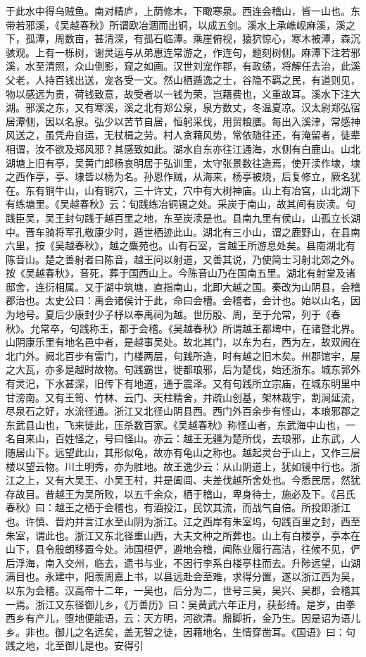 \documentclass[12pt,UTF8]{ctexbook}
\begin{document}
于此水中得乌贼鱼。南对精庐，上荫修木，下瞰寒泉。西连会稽山，皆一山也。东带若邪溪，《吴越春秋》所谓欧冶涸而出铜，以成五剑。溪水上承嶕岘麻溪，溪之下，孤潭，周数亩，甚清深，有孤石临潭。乘崖俯视，猿狖惊心，寒木被潭，森沉骇观。上有一栎树，谢灵运与从弟惠连常游之，作连句，题刻树侧。麻潭下注若邪溪，水至清照，众山倒影，窥之如画。汉世刘宠作郡，有政绩，将解任去治，此溪父老，人持百钱出送，宠各受一文。然山栖遁逸之士，谷隐不羁之民，有道则见，物以感远为贵，荷钱致意，故受者以一钱为荣，岂藉费也，义重故耳。溪水下注大湖。邪溪之东，又有寒溪，溪之北有郑公泉，泉方数丈，冬温夏凉。汉太尉郑弘宿居潭侧，因以名泉。弘少以苦节自居，恒躬采伐，用贸粮膳。每出入溪津，常感神风送之，虽凭舟自运，无杖楫之劳。村人贪藉风势，常依随往还，有淹留者，徒辈相谓，汝不欲及郑风邪？其感致如此。湖水自东亦往江通海，水侧有白鹿山。山北湖塘上旧有亭，吴黄门郎杨哀明居于弘训里，太守张景数往造焉，使开渎作埭，埭之西作亭，亭、埭皆以杨为名。孙恩作贼，从海来，杨亭被烧，后复修立，厥名犹在。东有铜牛山，山有铜穴，三十许丈，穴中有大树神庙。山上有冶宫，山北湖下有练塘里。《吴越春秋》云：旬践练冶铜锡之处。采炭于南山，故其间有炭渎。句践臣吴，吴王封句践于越百里之地，东至炭渎是也。县南九里有侯山，山孤立长湖中。晋车骑将军孔敬康少时，遁世栖迹此山。湖北有三小山，谓之鹿野山，在县南六里，按《吴越春秋》，越之麋苑也。山有石室，言越王所游息处矣。县南湖北有陈音山。楚之善射者曰陈音，越王问以射道，又善其说，乃使简士习射北郊之外。按《吴越春秋》，音死，葬于国西山上。今陈音山乃在国南五里。湖北有射堂及诸邸舍，连衍相属。又于湖中筑塘，直指南山，北即大越之国。秦改为山阴县，会稽郡治也。太史公曰：禹会诸侯计于此，命曰会槽。会稽者，会计也。始以山名，因为地号。夏后少康封少子杼以奉禹祠为越。世历殷、周，至于允常，列于《春秋》。允常卒，句践称王，都于会稽。《吴越春秋》所谓越王都埤中，在诸暨北界。山阴康乐里有地名邑中者，是越事吴处。故北其门，以东为右，西为左，故双阙在北门外。阙北百步有雷门，门楼两层，句践所造，时有越之旧木矣。州郡馆宇，屋之大瓦，亦多是越时故物。句践霸世，徙都琅邪，后为楚伐，始还浙东。城东郭外有灵汜，下水甚深，旧传下有地道，通于震泽。又有句践所立宗庙，在城东明里中甘滂南。又有王笥、竹林、云门、天柱精舍，并疏山创基，架林裁宇，割涧延流，尽泉石之好，水流径通。浙江又北径山阴县西。西门外百余步有怪山，本琅邪郡之东武县山也，飞来徙此，压杀数百家。《吴越春秋》称怪山者，东武海中山也，一名自来山，百姓怪之，号曰怪山。亦云：越王无疆为楚所伐，去琅邪，止东武，人随居山下。远望此山，其形似龟，故亦有龟山之称也。越起灵台于山上，又作三层楼以望云物。川土明秀，亦为胜地。故王逸少云：从山阴道上，犹如镜中行也。浙江之上，又有大吴王、小吴王村，并是阖闾、夫差伐越所舍处也。今悉民居，然犹存故目。昔越王为吴所败，以五千余众，栖于稽山，卑身待士，施必及下。《吕氏春秋》曰：越王之栖于会稽也，有酒投江，民饮其流，而战气自倍。所投即浙江也。许慎、晋灼并言江水至山阴为浙江。江之西岸有朱室坞，句践百里之封，西至朱室，谓此也。浙江又东北径重山西，大夫文种之所葬也。山上有白楼亭，亭本在山下，县令殷朗移置今处。沛国桓俨，避地会稽，闻陈业履行高洁，往候不见，俨后浮海，南入交州，临去，遗书与业，不因行李系白楼亭柱而去。升陟远望，山湖满目也。永建中，阳羡周嘉上书，以县远赴会至难，求得分置，遂以浙江西为吴，以东为会稽。汉高帝十二年，一吴也，后分为二，世号三吴，吴兴、吴郡，会稽其一焉。浙江又东径御儿乡，《万善历》曰：吴黄武六年正月，获彭绮。是岁，由拳西乡有产儿，堕地便能语，云：天方明，河欲清。鼎脚折，金乃生。因是诏为语儿乡。非也。御儿之名远矣，盖无智之徒，因藉地名，生情穿凿耳。《国语》曰：句践之地，北至御儿是也。安得引
\end{document}
